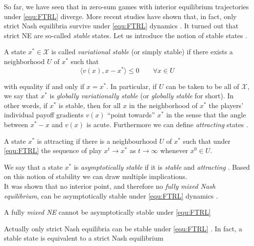 So far, we have seen that in zero-sum games with interior equilibrium trajectories under \ref{equ:FTRL} diverge. More recent studies have shown that, in fact, only strict Nash equilibria survive under \ref{equ:FTRL} dynamics \cite{flokas}. It turned out that strict NE are so-called \textit{stable} states. Let us introduce the notion of stable states \cite[Def. 2.3]{mertikopoulos}. 

\begin{definition}\label{def:stability}
    A state $x^* \in \mathcal{X}$ is called \textit{variational stable} (or simply stable) if there exists a neighborhood $U$ of $x^*$ such that 
    \[\langle v(x),x-x^*\rangle \le 0 \qquad \forall x \in U\]
\end{definition}

with equality if and only if $x = x^*$. In particular, if $U$ can be taken to be all of $\mathcal{X}$, we say that $x^*$ is \textit{globally variationally stable} (or \textit{globally stable} for short). In other words, if $x^*$ is stable, then for all $x$ in the neighborhood of $x^*$ the players’ individual payoff gradients $v(x)$ “point towards” $x^*$ in the sense that the angle between $x^* - x$ and $v(x)$ is acute. Furthermore we can define \textit{attracting} states \cite[Def. 3.2]{HDRmertikopoulos}. 

\begin{definition}\label{def:attracting}
    A state $x^*$ is attracting if there is a neighbourhood $U$ of $x^*$ such that under \ref{equ:FTRL} the sequence of play $x^t \to x^*$ as $t \to \infty$ whenever $x^0 \in U$. 
\end{definition}

We say that a state $x^*$ is \textit{asymptotically stable} if it is \textit{stable} and \textit{attracting} \cite{HDRmertikopoulos}. Based on this notion of stability we can draw multiple implications. \\

It was shown that no interior point, and therefore no \textit{fully mixed Nash equilibrium}, can be asymptotically stable under \ref{equ:FTRL} dynamics \cite[Theorem 1]{flokas}.  

\begin{proposition}\label{prop:noInteriorStable}
    A fully \textit{mixed NE} cannot be asymptotically stable under \ref{equ:FTRL}
\end{proposition}

Actually only strict Nash equilibria can be stable under \ref{equ:FTRL} \cite[Theorem 2]{flokas}. In fact, a stable state is equivalent to a strict Nash equilibrium \cite[Prop. 5.2]{mertikopoulos}

